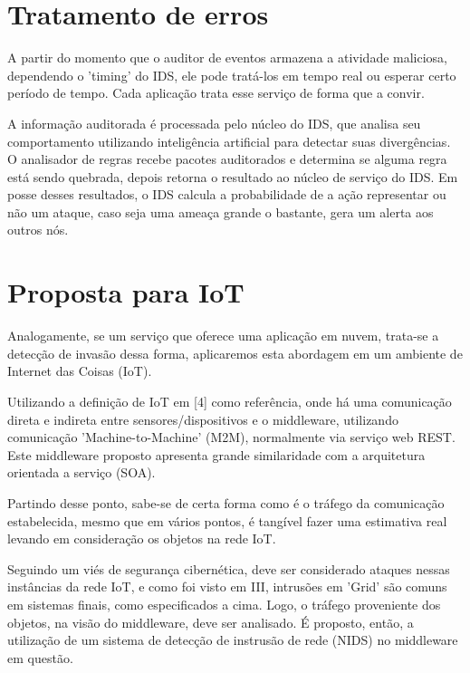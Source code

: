 \documentclass[journal]{IEEEtran}
\begin{document}
\section{Tratamento de erros}
A partir do momento que o auditor de eventos armazena a atividade maliciosa, dependendo o 'timing' do IDS, ele pode tratá-los em tempo real ou esperar certo período de tempo. Cada aplicação trata esse serviço de forma que a convir. \par
A informação auditorada é processada pelo núcleo do IDS, que analisa seu comportamento utilizando inteligência artificial para detectar suas divergências. O analisador de regras recebe pacotes auditorados e determina se alguma regra está sendo quebrada, depois retorna o resultado ao núcleo de serviço do IDS. Em posse desses resultados, o IDS calcula a probabilidade de a ação representar ou não um ataque, caso seja uma ameaça grande o bastante, gera um alerta aos outros nós.

\section{Proposta para IoT}
Analogamente, se um serviço que oferece uma aplicação em nuvem, trata-se a detecção de invasão dessa forma, aplicaremos esta abordagem em um ambiente de Internet das Coisas (IoT). \par

Utilizando a definição de IoT em [4] como referência, onde há uma comunicação direta e indireta entre sensores/dispositivos e o middleware, utilizando comunicação 'Machine-to-Machine' (M2M), normalmente via serviço web REST. Este middleware proposto apresenta grande similaridade com a arquitetura orientada a serviço (SOA). \par

Partindo desse ponto, sabe-se de certa forma como é o tráfego da comunicação estabelecida, mesmo que em vários pontos, é tangível fazer uma estimativa real levando em consideração os objetos na rede IoT. \par

Seguindo um viés de segurança cibernética, deve ser considerado ataques nessas instâncias da rede IoT, e como foi visto em III, intrusões em 'Grid' são comuns em sistemas finais, como especificados a cima. Logo, o tráfego proveniente dos objetos, na visão do middleware, deve ser analisado. É proposto, então, a utilização de um sistema de detecção de instrusão de rede (NIDS) no middleware em questão. \par
\end{document}
